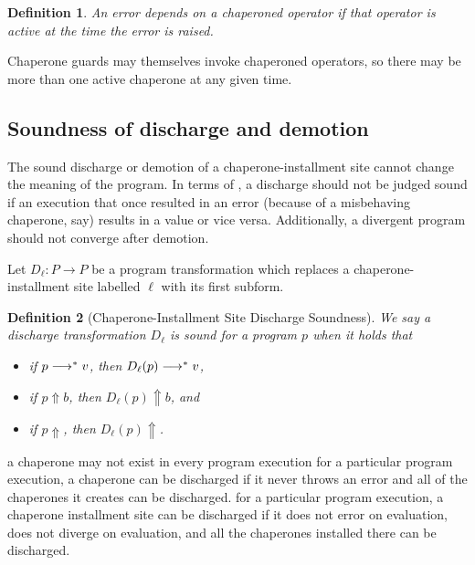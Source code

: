 \documentclass{sigplanconf}
\newtheorem{definition}{Definition}
\begin{document}
\begin{definition}
An error \emph{depends} on a chaperoned operator if that operator is active at the time the error is raised.
\end{definition}

Chaperone guards may themselves invoke chaperoned operators, so there may be more than one active chaperone at any given time.


\subsection{Soundness of discharge and demotion}

The sound discharge or demotion of a chaperone-installment site cannot change the meaning of the program.
In terms of \chapcalc, a discharge should not be judged sound if an execution that once resulted in an error (because of a misbehaving chaperone, say) results in a value or vice versa.
Additionally, a divergent program should not converge after demotion.

Let $D_\ell : P\rightarrow P$ be a program transformation which replaces a chaperone-installment site labelled $\ell$ with its first subform.

\begin{definition}[Chaperone-Installment Site Discharge Soundness]
We say a discharge transformation $D_\ell$ is sound for a program $p$ when it holds that
\begin{itemize}
\item if $p\longrightarrow^{*} v$, then $D_\ell(p)\longrightarrow^{*} v$,
\item if $p\Uparrow b$, then $D_\ell(p)\Uparrow b$, and
\item if $p\Uparrow$, then $D_\ell(p)\Uparrow$.
\end{itemize}
\end{definition}


a chaperone may not exist in every program execution
for a particular program execution, a chaperone can be discharged if it never throws an error and all of the chaperones it creates can be discharged.
for a particular program execution, a chaperone installment site can be discharged if it does not error on evaluation, does not diverge on evaluation, and all the chaperones installed there can be discharged.
\end{document}

